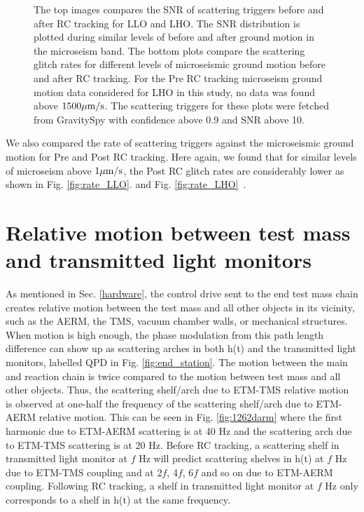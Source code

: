 \documentclass[12pt]{iopart}
\begin{document}
\begin{figure}[h]
    
    
    \caption{The top images compares the SNR of scattering triggers before and after RC tracking for LLO and LHO. The  SNR distribution is plotted during similar levels of before and after ground motion in the microseism band. The bottom plots compare the scattering glitch rates for different levels of microseismic ground motion before and after RC tracking. For the Pre RC tracking microseism ground motion data considered for LHO in this study, no data was found above $1500\mu{\rm m/s}$. The scattering triggers for these plots were fetched from GravitySpy with confidence above 0.9 and SNR above 10.} 
    \label{fig:postr0_scat}
    
\end{figure}
We also compared the rate of scattering triggers against the microseismic ground motion for Pre and Post RC tracking. Here again, we found that for similar levels of microseism above $1\mu{\rm m/s}$, the Post RC glitch rates are considerably lower as shown in Fig. \ref{fig:rate_LLO}. and Fig. \ref{fig:rate_LHO}~\cite{alog_corey}.


\section{Relative motion between test mass and transmitted light monitors} \label{transmon_scattering}
As mentioned in Sec. \ref{hardware}, the control drive sent to the end test mass chain creates relative motion between the test mass and all other objects in its vicinity, such as the AERM, the TMS, vacuum chamber walls, or mechanical structures. When motion is high enough, the phase modulation from this path length difference can show up as scattering arches in both h(t) and the transmitted light monitors, labelled QPD in Fig. \ref{fig:end_station}. The motion between the main and reaction chain is twice compared to the motion between test mass and all other objects. Thus, the scattering shelf/arch due to ETM-TMS relative motion is observed at one-half the frequency of the scattering shelf/arch due to ETM-AERM relative motion. This can be seen in Fig. \ref{fig:1262darm} where the first harmonic due to ETM-AERM scattering is at 40 Hz and the scattering arch due to ETM-TMS scattering is at 20 Hz. Before RC tracking, a scattering shelf in transmitted light monitor at $f$ Hz will predict scattering shelves in h(t) at $f$ Hz due to ETM-TMS coupling and at 2$f$, 4$f$, 6$f$ and so on due to ETM-AERM coupling. Following RC tracking, a shelf in transmitted light monitor at $f$ Hz only corresponds to a shelf in h(t) at the same frequency.
\par
 
\end{document}
